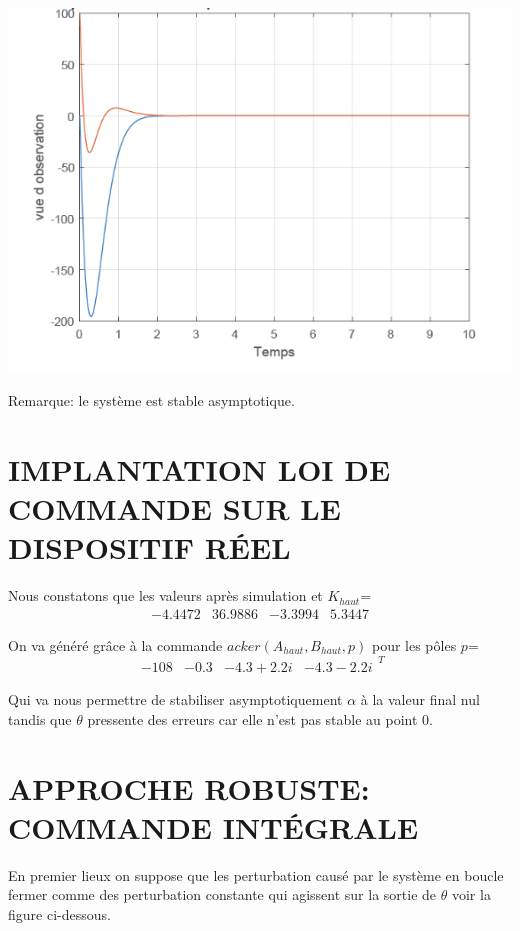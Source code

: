 \documentclass[12pt, a4paper, openany]{report}
\begin{document}
\begin{center}
{\includegraphics[scale=0.6]{fig10.png}} 
\label{fiig10}
\end{center} 

Remarque: le système est stable asymptotique.

\chapter{IMPLANTATION LOI DE COMMANDE SUR LE DISPOSITIF RÉEL}
     
     Nous constatons que les valeurs après simulation et  
    $K_{haut}$=
$$
\begin{matrix}
-4.4472 &  36.9886  & -3.3994 &   5.3447
\end{matrix} 
$$     

     On va généré grâce à la commande $acker(A_{haut},B_{haut},p)$
pour les pôles $p$=
$$
\begin{matrix}
-108&-0.3&-4.3+2.2i&-4.3-2.2i
\end{matrix}^{T}
$$

     Qui va nous permettre  de stabiliser asymptotiquement $\alpha$ à la valeur final nul tandis que $\theta$ pressente des erreurs car elle n'est pas  stable au point  0.
     
\chapter{APPROCHE ROBUSTE: COMMANDE INTÉGRALE}
     En premier lieux on suppose que les perturbation causé par le système en boucle fermer comme des perturbation constante qui agissent sur la sortie de $\theta$ voir la figure ci-dessous.  
     
\end{document}
